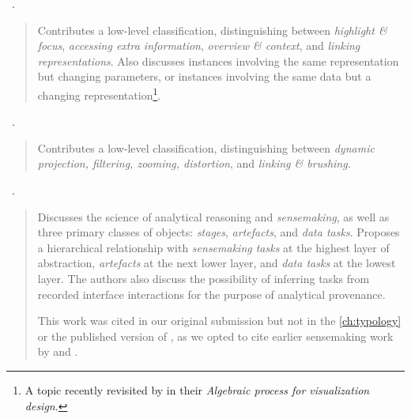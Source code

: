 \begin{sloppypar}
~\cite{Dix1998}. \end{sloppypar}

\begin{quotation}
    Contributes a low-level classification, distinguishing between {\it  highlight \& focus}, {\it accessing extra information}, {\it overview \& context}, and {\it linking representations}. 
    Also discusses instances involving the same representation but changing parameters, or instances involving the same data but a changing representation\footnote{A topic recently revisited by \citet{Kindlmann2014} in their {\it Algebraic process for visualization design}.}.
\end{quotation}

\begin{sloppypar}
~\cite{Keim2002}. \end{sloppypar}

\begin{quotation}
    Contributes a low-level classification, distinguishing between {\it dynamic projection, filtering, zooming, distortion}, and {\it linking \& brushing}.
\end{quotation}

\begin{sloppypar}
~\cite{Ribarsky2009}. \end{sloppypar}

\begin{quotation}
    Discusses the science of analytical reasoning and {\it sensemaking}, as well as three primary classes of objects: {\it stages}, {\it artefacts}, and {\it data tasks}. 
    Proposes a hierarchical relationship with {\it sensemaking tasks} at the highest layer of abstraction, {\it artefacts} at the next lower layer, and {\it data tasks} at the lowest layer.
    The authors also discuss the possibility of inferring tasks from recorded interface interactions for the purpose of analytical provenance.
    
    This work was cited in our original submission but not in the  \autoref{ch:typology} or the published version of \citet{Brehmer2013}, as we opted to cite earlier sensemaking work by \citet{Pirolli2005} and \citet{Klein2006}.
\end{quotation}

